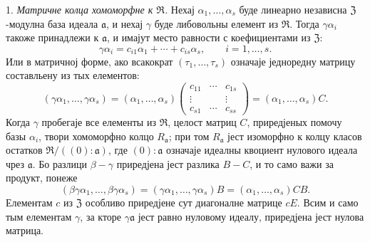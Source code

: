 \documentclass[11pt]{article}
\begin{document}
\setcounter{footnote}{24}

1. \emph{Матричне колца хомоморфне к $\mathfrak R$.} Нехај $\alpha_1,\ldots,\alpha_s$ буде линеарно независна $\mathfrak Z$-модулна база идеала $\mathfrak a$, и нехај $\gamma$ буде либовольны елемент из $\mathfrak R$. Тогда $\gamma\alpha_i$ такоже принадлежи к $\mathfrak a$, и имајут место равности с коефициентами из $\mathfrak Z$:
\[
        \gamma\alpha_i=c_{i1}\alpha_1+\cdots+c_{is}\alpha_s,
        \qquad i=1,\ldots,s.
\]
Или в матричној форме, ако всакократ $(\tau_1,\ldots,\tau_s)$ означаје једноредну матрицу составльену из тых елементов:
\[
 (\gamma\alpha_1,\ldots,\gamma\alpha_s)
 = (\alpha_1,\ldots,\alpha_s)
   \begin{pmatrix}
      c_{11}&\cdots&c_{1s}\\
      \vdots&&\vdots\\
      c_{s1}&\cdots&c_{ss}
   \end{pmatrix}
 = (\alpha_1,\ldots,\alpha_s)C.
\]
Когда $\gamma$ пробегаје все елементы из $\mathfrak R$, целост матриц $C$, приредјеных помочу базы $\alpha_i$, твори хомоморфно колцо $R_\mathfrak a$; при том $R_\mathfrak a$ јест изоморфно к колцу класов остатков $\mathfrak R/((0):\mathfrak a)$, где $(0):\mathfrak a$ означаје идеалны квоциент нулового идеала чрез $\mathfrak a$. Бо разлици $\beta-\gamma$ приредјена јест разлика $B-C$, и то само важи за продукт, понеже
\[
(\beta\gamma\alpha_1,\ldots,\beta\gamma\alpha_s)
=(\gamma\alpha_1,\ldots,\gamma\alpha_s)B
=(\alpha_1,\ldots,\alpha_s)CB.
\]
Елементам $c$ из $\mathfrak Z$ особливо приредјене сут диагоналне матрице $cE$. Всим и само тым елементам $\gamma$, за кторе $\gamma\mathfrak a$ јест равно нуловому идеалу, приредјена јест нулова матрица.
\end{document}
